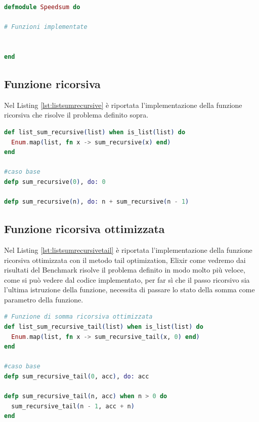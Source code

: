\begin{lstlisting}[language=elixir,captionpos=b,
	caption={Modulo di riferimento},
	label={lst:speedSum}]
defmodule Speedsum do

# Funzioni implementate


end


\end{lstlisting}


\subsection{Funzione ricorsiva}
Nel Listing \ref{lst:listsumrecursive} è riportata l'implementazione
della funzione ricorsiva che risolve il problema definito sopra.

\begin{lstlisting}[language=elixir,captionpos=b,
	caption={Funzione list\_sum\_recursive()},
	label={lst:listsumrecursive}]
def list_sum_recursive(list) when is_list(list) do
  Enum.map(list, fn x -> sum_recursive(x) end)
end

#caso base
defp sum_recursive(0), do: 0

defp sum_recursive(n), do: n + sum_recursive(n - 1)
\end{lstlisting}

\subsection{Funzione ricorsiva ottimizzata}
Nel Listing \ref{lst:listsumrecursivetail} è riportata l'implementazione
della funzione ricorsiva ottimizzata con il metodo tail optimization,
Elixir come vedremo dai risultati del Benchmark risolve il problema
definito in modo molto più veloce, come si può vedere dal codice
implementato, per far sì che il passo ricorsivo sia l'ultima
istruzione della funzione, necessita di passare lo stato della
somma come parametro della funzione.

\begin{lstlisting}[language=elixir,captionpos=b,
	caption={Funzione list\_sum\_recursive\_tail()},
	label={lst:listsumrecursivetail}]
# Funzione di somma ricorsiva ottimizzata
def list_sum_recursive_tail(list) when is_list(list) do
  Enum.map(list, fn x -> sum_recursive_tail(x, 0) end)
end
  
#caso base
defp sum_recursive_tail(0, acc), do: acc

defp sum_recursive_tail(n, acc) when n > 0 do
  sum_recursive_tail(n - 1, acc + n)
end
\end{lstlisting}

